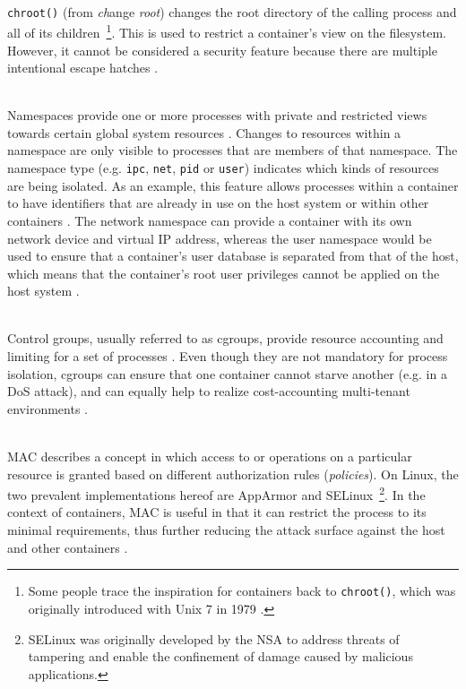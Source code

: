 \begin{description}[format={\storedescriptionlabel}]
  \item[Chroots\label{itm:chroots}]
  \hfill \\
  \texttt{chroot()} (from \textit{ch}ange \textit{root}) changes the root directory of the calling process and all of its children~\footnote{Some people trace the inspiration for containers back to \texttt{chroot()}, which was originally introduced with Unix 7 in 1979 \cite[p.~82]{bernstein2014containers}.}. This is used to restrict a container's view on the filesystem. However, it cannot be considered a security feature because there are multiple intentional escape hatches \cite[p.~3]{eder2016hypervisor}.

  \item[Namespaces]
  \hfill \\
  Namespaces provide one or more processes with private and restricted views towards certain global system resources \cite[p.~387]{morabito2015hypervisors}. Changes to resources within a namespace are only visible to processes that are members of that namespace. The namespace type (e.g. \texttt{ipc}, \texttt{net}, \texttt{pid} or \texttt{user}) indicates which kinds of resources are being isolated. As an example, this feature allows processes within a container to have identifiers that are already in use on the host system or within other containers \cite[p.~3] {eder2016hypervisor}. The network namespace can provide a container with its own network device and virtual \acs{IP} address, whereas the user namespace would be used to ensure that a container's user database is separated from that of the host, which means that the container's root user privileges cannot be applied on the host system \cite[p.~1]{merkel2014docker}.

  \item[Control groups]
  \hfill \\
  Control groups, usually referred to as cgroups, provide resource accounting and limiting for a set of processes  \cite[p.~387]{morabito2015hypervisors} \cite[p.~1]{merkel2014docker}. Even though they are not mandatory for process isolation, cgroups can ensure that one container cannot starve another (e.g. in a \acs{DoS} attack), and can equally help to realize cost-accounting multi-tenant environments \cite[p.~4]{eder2016hypervisor}.

  \item[\acl{MAC}]
  \hfill \\
  \ac{MAC} describes a concept in which access to or operations on a particular resource is granted based on different authorization rules (\textit{policies}). On Linux, the two prevalent implementations hereof are AppArmor and \acs{SELinux}~\footnote{\ac{SELinux} was originally developed by the \acs{NSA} to address threats of tampering and enable the confinement of damage caused by malicious applications.}. In the context of containers, \ac{MAC} is useful in that it can restrict the process to its minimal requirements, thus further reducing the attack surface against the host and other containers \cite[p.~4]{eder2016hypervisor}.
\end{description}


